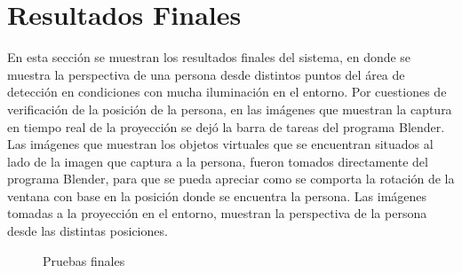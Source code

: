 \documentclass[a4paper,openright,12pt]{report}
\begin{document}
\section{Resultados Finales}
En esta sección se muestran los resultados finales del sistema, en donde se muestra la perspectiva de una persona desde distintos puntos del área de detección en condiciones con mucha iluminación en el entorno. Por cuestiones de verificación de la posición de la persona, en las imágenes que muestran la captura en tiempo real de la proyección se dejó la barra de tareas del programa Blender. Las imágenes que muestran los objetos virtuales que se encuentran situados al lado de la imagen que captura a la persona, fueron tomados directamente del programa Blender, para que se pueda apreciar como se comporta la rotación de la ventana con base en la posición donde se encuentra la persona. Las imágenes tomadas a la proyección en el entorno, muestran la perspectiva de la persona desde las distintas posiciones.
\begin{figure}[H]
	\centering
	\caption{Pruebas finales}\label{fig:pruebas}
\end{figure}

\end{document}
